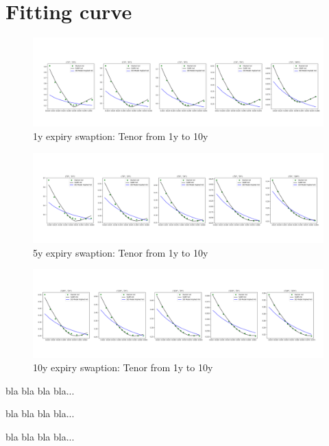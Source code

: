 \documentclass{article}
\begin{document}
\newpage
\section{Fitting curve}
\begin{figure}[h]
    \flushleft
	\includegraphics[width=1\linewidth]{./images/1Y.png}
	\caption{1y expiry swaption: Tenor from 1y to 10y}
	\label{fig:sub1}
\end{figure}
\begin{figure}[h]
	\flushleft
	\includegraphics[width=1\linewidth]{./images/5Y.png}
	\caption{5y expiry swaption: Tenor from 1y to 10y}
	\label{fig:sub1}
\end{figure}
\begin{figure}[h]
	\flushleft
	\includegraphics[width=1\linewidth]{./images/10Y.png}
	\caption{10y expiry swaption: Tenor from 1y to 10y}
	\label{fig:sub1}
\end{figure}

bla bla bla bla...

bla bla bla bla...

bla bla bla bla...
\end{document}
